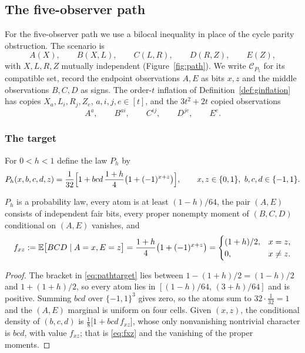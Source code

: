 \providecommand{\Cpath}{\mathcal C_{P_5}}
\providecommand{\Real}{\operatorname{Re}}

\subsection{The five-observer path}\label{sec:fivepath}

For the five-observer path we use a bilocal inequality in place of the cycle parity obstruction. The scenario is
\[
A(X),\qquad B(X,L),\qquad C(L,R),\qquad D(R,Z),\qquad E(Z),
\]
with $X,L,R,Z$ mutually independent (Figure~\ref{fig:path}). We write $\Cpath$ for its compatible set, record the endpoint observations $A,E$ as bits $x,z$ and the middle observations $B,C,D$ as signs. The order-$t$ inflation of Definition~\ref{def:ginflation} has copies $X_a,L_i,R_j,Z_e$, $a,i,j,e\in[t]$, and the $3t^2+2t$ copied observations
\[
A^a,\qquad B^{ai},\qquad C^{ij},\qquad D^{je},\qquad E^e .
\]



\subsubsection{The target}\label{sec:pathtarget}

\begin{definition}\label{def:pathtarget}
For $0<h<1$ define the law $P_h$ by
\begin{equation}\label{eq:pathtarget}
P_h(x,b,c,d,z)=\frac1{32}\Bigl[1+bcd\,\frac{1+h}4\bigl(1+(-1)^{x+z}\bigr)\Bigr],
\qquad x,z\in\{0,1\},\ b,c,d\in\{-1,1\}.
\end{equation}
\end{definition}
\FloatBarrier

\begin{lemma}[Properties of $P_h$]\label{lem:pathtarget}
$P_h$ is a probability law, every atom is at least $(1-h)/64$, the pair $(A,E)$ consists of independent fair bits, every proper nonempty moment of $(B,C,D)$ conditional on $(A,E)$ vanishes, and
\begin{equation}\label{eq:fxz}
f_{xz}:=\mathbb E\bigl[BCD\mid A=x,E=z\bigr]=\frac{1+h}4\bigl(1+(-1)^{x+z}\bigr)
=\begin{cases}(1+h)/2,&x=z,\\0,&x\ne z.\end{cases}
\end{equation}
\end{lemma}

\begin{proof}
The bracket in \eqref{eq:pathtarget} lies between $1-(1+h)/2=(1-h)/2$ and $1+(1+h)/2$, so every atom lies in $[(1-h)/64,\,(3+h)/64]$ and is positive. Summing $bcd$ over $\{-1,1\}^3$ gives zero, so the atoms sum to $32\cdot\frac1{32}=1$ and the $(A,E)$ marginal is uniform on four cells. Given $(x,z)$, the conditional density of $(b,c,d)$ is $\frac18\bigl[1+bcd\,f_{xz}\bigr]$, whose only nonvanishing nontrivial character is $bcd$, with value $f_{xz}$; that is \eqref{eq:fxz} and the vanishing of the proper moments.
\end{proof}

